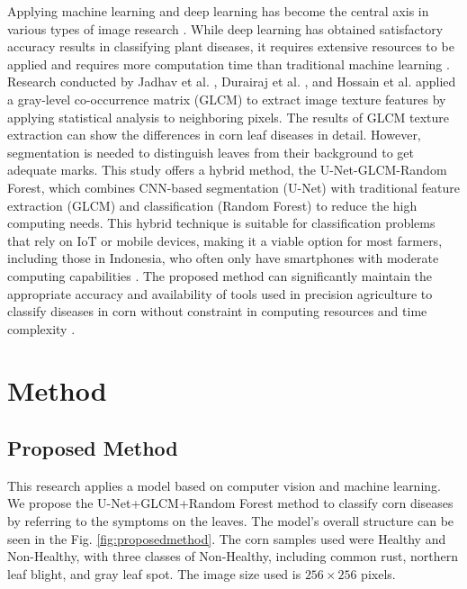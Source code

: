 \documentclass[10pt,a4paper]{article}
\begin{document}
Applying machine learning and deep learning has become the central axis in various types of image research \cite{Demilie2024,Ashwini2024,CatalReis2024}. While deep learning has obtained satisfactory accuracy results in classifying plant diseases, it requires extensive resources to be applied and requires more computation time than traditional machine learning \cite{Utaminingrum2023}. Research conducted by Jadhav et al. \cite{Jadhav2021}, Durairaj et al. \cite{Durairaj2020}, and Hossain et al. \cite{Hossain2019} applied a gray-level co-occurrence matrix (GLCM) to extract image texture features by applying statistical analysis to neighboring pixels. The results of GLCM texture extraction can show the differences in corn leaf diseases in detail. However, segmentation is needed to distinguish leaves from their background to get adequate marks. This study offers a hybrid method, the U-Net-GLCM-Random Forest, which combines CNN-based segmentation (U-Net) with traditional feature extraction (GLCM) and classification (Random Forest) to reduce the high computing needs. This hybrid technique is suitable for classification problems that rely on IoT or mobile devices, making it a viable option for most farmers, including those in Indonesia, who often only have smartphones with moderate computing capabilities \cite{David2023}. The proposed method can significantly maintain the appropriate accuracy and availability of tools used in precision agriculture to classify diseases in corn without constraint in computing resources \cite{Nawrocki2023} and time complexity \cite{Theodoropoulos2023}.

\section{Method}

\subsection{Proposed Method}

This research applies a model based on computer vision and machine learning. We propose the U-Net+GLCM+Random Forest method to classify corn diseases by referring to the symptoms on the leaves. The model's overall structure can be seen in the Fig. \ref{fig:proposedmethod}. The corn samples used were Healthy and Non-Healthy, with three classes of Non-Healthy, including common rust, northern leaf blight, and gray leaf spot. The image size used is $256 \times 256$ pixels. 
\end{document}

